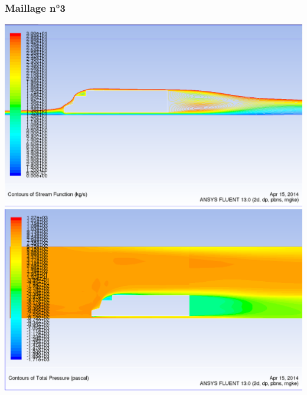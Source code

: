 \documentclass[handout]{beamer}
\begin{document}
\begin{frame}
	\frametitle{Maillage n°3}
	\begin{center}
	\includegraphics[scale=0.15]{../resultsCx/remorque2_110_stream.png}\\
	\includegraphics[scale=0.15]{../resultsCx/remorque2-110_pressure.png}
	\end{center}
\end{frame}
\end{document}
